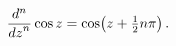 \[\frac{{d}^{n}}{{dz}^{n}}\mathop{\cos\/}\nolimits z=\mathop{\cos\/}\nolimits\!%
\left(z+\tfrac{1}{2}n\pi\right).\]
